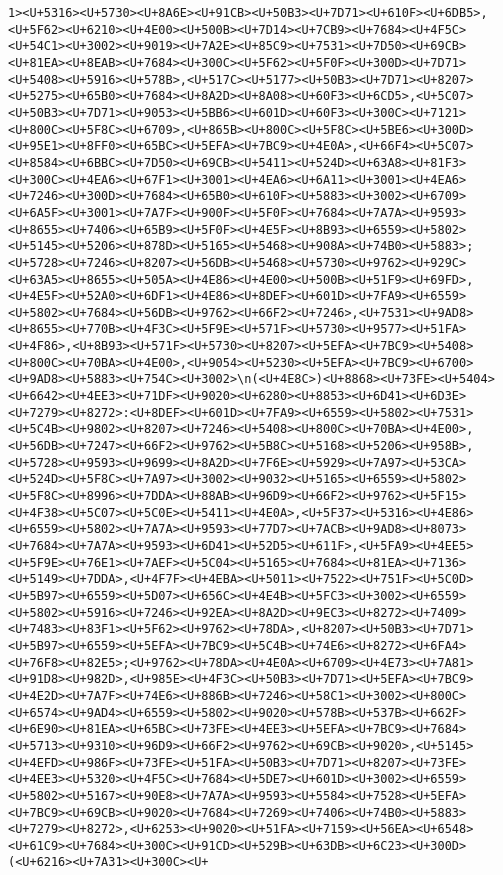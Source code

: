 \documentclass[
]{article}
\begin{document}
\begin{verbatim}
1><U+5316><U+5730><U+8A6E><U+91CB><U+50B3><U+7D71><U+610F><U+6DB5>,<U+5F62><U+6210><U+4E00><U+500B><U+7D14><U+7CB9><U+7684><U+4F5C><U+54C1><U+3002><U+9019><U+7A2E><U+85C9><U+7531><U+7D50><U+69CB><U+81EA><U+8EAB><U+7684><U+300C><U+5F62><U+5F0F><U+300D><U+7D71><U+5408><U+5916><U+578B>,<U+517C><U+5177><U+50B3><U+7D71><U+8207><U+5275><U+65B0><U+7684><U+8A2D><U+8A08><U+60F3><U+6CD5>,<U+5C07><U+50B3><U+7D71><U+9053><U+5BB6><U+601D><U+60F3><U+300C><U+7121><U+800C><U+5F8C><U+6709>,<U+865B><U+800C><U+5F8C><U+5BE6><U+300D><U+95E1><U+8FF0><U+65BC><U+5EFA><U+7BC9><U+4E0A>,<U+66F4><U+5C07><U+8584><U+6BBC><U+7D50><U+69CB><U+5411><U+524D><U+63A8><U+81F3><U+300C><U+4EA6><U+67F1><U+3001><U+4EA6><U+6A11><U+3001><U+4EA6><U+7246><U+300D><U+7684><U+65B0><U+610F><U+5883><U+3002><U+6709><U+6A5F><U+3001><U+7A7F><U+900F><U+5F0F><U+7684><U+7A7A><U+9593><U+8655><U+7406><U+65B9><U+5F0F><U+4E5F><U+8B93><U+6559><U+5802><U+5145><U+5206><U+878D><U+5165><U+5468><U+908A><U+74B0><U+5883>;<U+5728><U+7246><U+8207><U+56DB><U+5468><U+5730><U+9762><U+929C><U+63A5><U+8655><U+505A><U+4E86><U+4E00><U+500B><U+51F9><U+69FD>,<U+4E5F><U+52A0><U+6DF1><U+4E86><U+8DEF><U+601D><U+7FA9><U+6559><U+5802><U+7684><U+56DB><U+9762><U+66F2><U+7246>,<U+7531><U+9AD8><U+8655><U+770B><U+4F3C><U+5F9E><U+571F><U+5730><U+9577><U+51FA><U+4F86>,<U+8B93><U+571F><U+5730><U+8207><U+5EFA><U+7BC9><U+5408><U+800C><U+70BA><U+4E00>,<U+9054><U+5230><U+5EFA><U+7BC9><U+6700><U+9AD8><U+5883><U+754C><U+3002>\n(<U+4E8C>)<U+8868><U+73FE><U+5404><U+6642><U+4EE3><U+71DF><U+9020><U+6280><U+8853><U+6D41><U+6D3E><U+7279><U+8272>:<U+8DEF><U+601D><U+7FA9><U+6559><U+5802><U+7531><U+5C4B><U+9802><U+8207><U+7246><U+5408><U+800C><U+70BA><U+4E00>,<U+56DB><U+7247><U+66F2><U+9762><U+5B8C><U+5168><U+5206><U+958B>,<U+5728><U+9593><U+9699><U+8A2D><U+7F6E><U+5929><U+7A97><U+53CA><U+524D><U+5F8C><U+7A97><U+3002><U+9032><U+5165><U+6559><U+5802><U+5F8C><U+8996><U+7DDA><U+88AB><U+96D9><U+66F2><U+9762><U+5F15><U+4F38><U+5C07><U+5C0E><U+5411><U+4E0A>,<U+5F37><U+5316><U+4E86><U+6559><U+5802><U+7A7A><U+9593><U+77D7><U+7ACB><U+9AD8><U+8073><U+7684><U+7A7A><U+9593><U+6D41><U+52D5><U+611F>,<U+5FA9><U+4EE5><U+5F9E><U+76E1><U+7AEF><U+5C04><U+5165><U+7684><U+81EA><U+7136><U+5149><U+7DDA>,<U+4F7F><U+4EBA><U+5011><U+7522><U+751F><U+5C0D><U+5B97><U+6559><U+5D07><U+656C><U+4E4B><U+5FC3><U+3002><U+6559><U+5802><U+5916><U+7246><U+92EA><U+8A2D><U+9EC3><U+8272><U+7409><U+7483><U+83F1><U+5F62><U+9762><U+78DA>,<U+8207><U+50B3><U+7D71><U+5B97><U+6559><U+5EFA><U+7BC9><U+5C4B><U+74E6><U+8272><U+6FA4><U+76F8><U+82E5>;<U+9762><U+78DA><U+4E0A><U+6709><U+4E73><U+7A81><U+91D8><U+982D>,<U+985E><U+4F3C><U+50B3><U+7D71><U+5EFA><U+7BC9><U+4E2D><U+7A7F><U+74E6><U+886B><U+7246><U+58C1><U+3002><U+800C><U+6574><U+9AD4><U+6559><U+5802><U+9020><U+578B><U+537B><U+662F><U+6E90><U+81EA><U+65BC><U+73FE><U+4EE3><U+5EFA><U+7BC9><U+7684><U+5713><U+9310><U+96D9><U+66F2><U+9762><U+69CB><U+9020>,<U+5145><U+4EFD><U+986F><U+73FE><U+51FA><U+50B3><U+7D71><U+8207><U+73FE><U+4EE3><U+5320><U+4F5C><U+7684><U+5DE7><U+601D><U+3002><U+6559><U+5802><U+5167><U+90E8><U+7A7A><U+9593><U+5584><U+7528><U+5EFA><U+7BC9><U+69CB><U+9020><U+7684><U+7269><U+7406><U+74B0><U+5883><U+7279><U+8272>,<U+6253><U+9020><U+51FA><U+7159><U+56EA><U+6548><U+61C9><U+7684><U+300C><U+91CD><U+529B><U+63DB><U+6C23><U+300D>(<U+6216><U+7A31><U+300C><U+
\end{verbatim}
\end{document}
